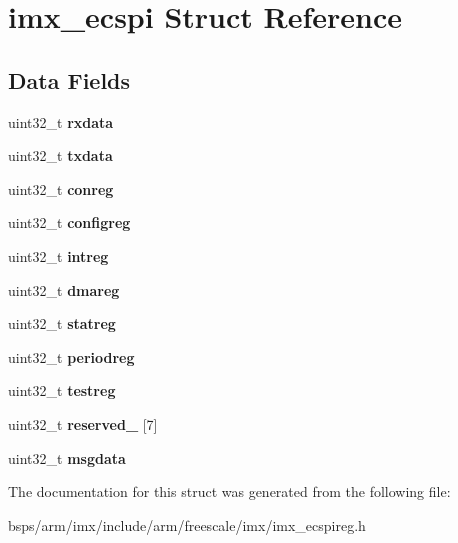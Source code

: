 \hypertarget{structimx__ecspi}{}\section{imx\+\_\+ecspi Struct Reference}
\label{structimx__ecspi}
\subsection*{Data Fields}
\begin{DoxyCompactItemize}
\item 
\mbox{\label{structimx__ecspi_a8bf805757ac833356f901d75a9e4f936}} 
uint32\+\_\+t {\bfseries rxdata}
\item 
\mbox{\label{structimx__ecspi_a44eda050b5c1ae16fd30e7bb6e4113ec}} 
uint32\+\_\+t {\bfseries txdata}
\item 
\mbox{\label{structimx__ecspi_a9570f3b002127f7b89e380f26adc50e1}} 
uint32\+\_\+t {\bfseries conreg}
\item 
\mbox{\label{structimx__ecspi_a44a435c4b540dd49a7e09f85ab64dedf}} 
uint32\+\_\+t {\bfseries configreg}
\item 
\mbox{\label{structimx__ecspi_a1c3595414aeef40196a6f5711c135e07}} 
uint32\+\_\+t {\bfseries intreg}
\item 
\mbox{\label{structimx__ecspi_a0533cef9aee0125df51881111902488e}} 
uint32\+\_\+t {\bfseries dmareg}
\item 
\mbox{\label{structimx__ecspi_a8bbaaf0eb4baf2ae297f130f11437b57}} 
uint32\+\_\+t {\bfseries statreg}
\item 
\mbox{\label{structimx__ecspi_a77cd4bbc08a5faca254ab5af0e8e15a5}} 
uint32\+\_\+t {\bfseries periodreg}
\item 
\mbox{\label{structimx__ecspi_ac76507680b94ca9cdf8cbcd088583bc4}} 
uint32\+\_\+t {\bfseries testreg}
\item 
\mbox{\label{structimx__ecspi_af7df43d3ff841aaee75262e949bb51bc}} 
uint32\+\_\+t {\bfseries reserved\+\_} \mbox{[}7\mbox{]}
\item 
\mbox{\label{structimx__ecspi_a6baf215a506a10b6b0d52d84d28ddf4d}} 
uint32\+\_\+t {\bfseries msgdata}
\end{DoxyCompactItemize}


The documentation for this struct was generated from the following file\+:\begin{DoxyCompactItemize}
\item 
bsps/arm/imx/include/arm/freescale/imx/imx\+\_\+ecspireg.\+h\end{DoxyCompactItemize}
